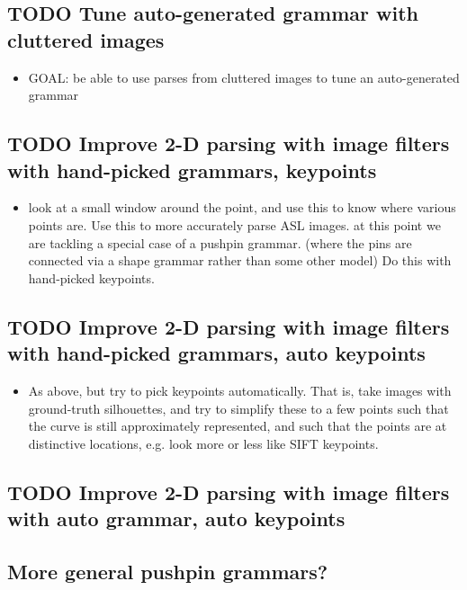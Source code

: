 \documentclass{book}
\begin{document}
\subsection{\textbf{TODO} Tune auto-generated grammar with cluttered images}
\label{sec-5_29_7}

\begin{itemize}
\item GOAL: be able to use parses from cluttered images to tune an
    auto-generated grammar
\end{itemize}
\subsection{\textbf{TODO} Improve 2-D parsing with image filters with hand-picked grammars, keypoints}
\label{sec-5_29_8}

\begin{itemize}
\item look at a small window around the point, and use this to know
    where various points are. Use this to more accurately parse ASL
    images. at this point we are tackling a special case of a pushpin
    grammar. (where the pins are connected via a shape grammar rather
    than some other model) Do this with hand-picked keypoints.
\end{itemize}
\subsection{\textbf{TODO} Improve 2-D parsing with image filters with hand-picked grammars, auto keypoints}
\label{sec-5_29_9}

\begin{itemize}
\item As above, but try to pick keypoints automatically. That is, take
    images with ground-truth silhouettes, and try to simplify these to
    a few points such that the curve is still approximately
    represented, and such that the points are at distinctive
    locations, e.g. look more or less like SIFT keypoints.
\end{itemize}
\subsection{\textbf{TODO} Improve 2-D parsing with image filters with auto grammar, auto keypoints}
\label{sec-5_29_10}
\subsection{More general pushpin grammars?}
\label{sec-5_29_11}
\end{document}
